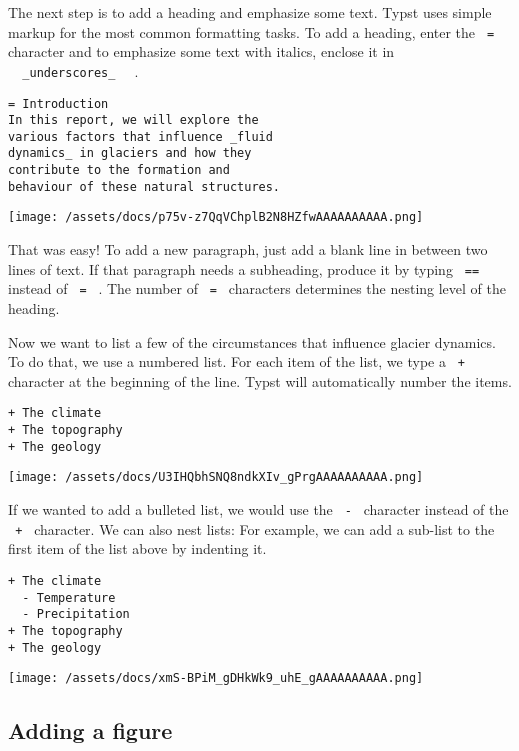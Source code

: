 The next step is to add a heading and emphasize some text. Typst uses
simple markup for the most common formatting tasks. To add a heading,
enter the \texttt{\ =\ } character and to emphasize some text with
italics, enclose it in
\texttt{\ }{\texttt{\ \_underscores\_\ }}\texttt{\ } .

\begin{verbatim}
= Introduction
In this report, we will explore the
various factors that influence _fluid
dynamics_ in glaciers and how they
contribute to the formation and
behaviour of these natural structures.
\end{verbatim}

\texttt{[image: /assets/docs/p75v-z7QqVChplB2N8HZfwAAAAAAAAAA.png]}

That was easy! To add a new paragraph, just add a blank line in between
two lines of text. If that paragraph needs a subheading, produce it by
typing \texttt{\ ==\ } instead of \texttt{\ =\ } . The number of
\texttt{\ =\ } characters determines the nesting level of the heading.

Now we want to list a few of the circumstances that influence glacier
dynamics. To do that, we use a numbered list. For each item of the list,
we type a \texttt{\ +\ } character at the beginning of the line. Typst
will automatically number the items.

\begin{verbatim}
+ The climate
+ The topography
+ The geology
\end{verbatim}

\texttt{[image: /assets/docs/U3IHQbhSNQ8ndkXIv\_gPrgAAAAAAAAAA.png]}

If we wanted to add a bulleted list, we would use the \texttt{\ -\ }
character instead of the \texttt{\ +\ } character. We can also nest
lists: For example, we can add a sub-list to the first item of the list
above by indenting it.

\begin{verbatim}
+ The climate
  - Temperature
  - Precipitation
+ The topography
+ The geology
\end{verbatim}

\texttt{[image: /assets/docs/xmS-BPiM\_gDHkWk9\_uhE\_gAAAAAAAAAA.png]}

\subsection{Adding a figure}\label{figure}

